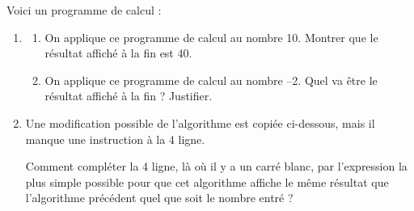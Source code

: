 \pagebreak


\begin{exercice}[CRPE 2017 G4]
   Voici un programme de calcul :
   \vspace*{-15mm}
   \begin{center}
      \begin{scratch}    
      \end{scratch}
   \end{center}
   \begin{enumerate}
      \item
         \begin{enumerate}
            \item On applique ce programme de calcul au nombre 10. Montrer que le résultat affiché à la fin est 40.
            \item On applique ce programme de calcul au nombre –2. Quel va être le résultat affiché à la fin ? Justifier.
         \end{enumerate}
      \item Une modification possible de l’algorithme est copiée ci-dessous, mais il manque une  instruction à la 4 ligne.
         \begin{center}
            \begin{scratch}    
            \end{scratch}
         \end{center} \medskip
         Comment compléter la 4 ligne, là où il y a un carré blanc, par l’expression la plus simple possible pour que cet algorithme affiche le même résultat que l’algorithme précédent quel que soit le nombre entré ?
   \end{enumerate}
\end{exercice}

